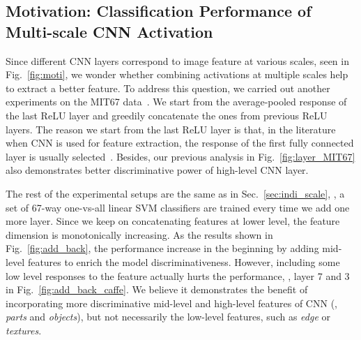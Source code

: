 \documentclass[10pt,twocolumn,letterpaper]{article}
\begin{document}
\subsection{Motivation: Classification Performance of Multi-scale CNN Activation\label{sec:multi}}

Since different CNN layers correspond to image feature at various scales, seen in Fig.~\ref{fig:moti}, we wonder whether combining activations at multiple scales help to extract a better feature. To address this question, we carried out another experiments on the MIT67 data~\cite{MIT67}. We start from the average-pooled response of the last ReLU layer and greedily concatenate the ones from previous ReLU layers. The reason we start from the last ReLU layer is that, in the literature when CNN is used for feature extraction, the response of the first fully connected layer is usually selected~\cite{cnn_baseline,Gong14}. Besides, our previous analysis in Fig.~\ref{fig:layer_MIT67} also demonstrates better discriminative power of high-level CNN layer.

The rest of the experimental setups are the same as in Sec.~\ref{sec:indi_scale}, \ie, a set of 67-way one-vs-all linear SVM classifiers are trained every time we add one more layer. Since we keep on concatenating features at lower level, the feature dimension is monotonically increasing. As the results shown in Fig.~\ref{fig:add_back}, the performance increase in the beginning by adding mid-level features to enrich the model discriminativeness. However, including some low level responses to the feature actually hurts the performance, \ie, layer 7 and 3 in Fig.~\ref{fig:add_back_caffe}. We believe it demonstrates the benefit of incorporating more discriminative mid-level and high-level features of CNN (\ie, \textit{parts} and \textit{objects}), but not necessarily the low-level features, such as \textit{edge} or \textit{textures}. 
\end{document}
